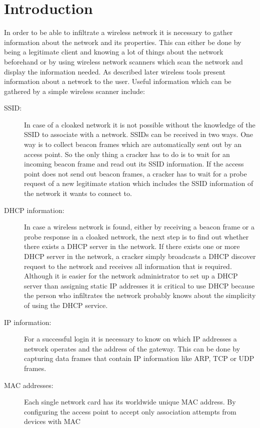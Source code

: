 \section{Introduction}

In order to be able to infiltrate a wireless network it is necessary to gather information about the network and its properties. This can either be done by being a legitimate client and knowing a lot of things about the network beforehand or by using wireless network scanners which scan the network and display the information needed. As described later wireless tools present information about a network to the user. Useful information which can be gathered by a simple wireless scanner include:

\begin{description}
    \item[SSID:]
		In case of a cloaked network it is not possible without the
		knowledge of the SSID to associate with a network. SSIDs can be received
		in two ways. One way is to collect beacon frames which are automatically sent out by an access point. So the only thing a cracker has to do is to wait for an incoming beacon frame and read out its SSID information. If the access point does not send out beacon frames, a cracker has to
		wait for a probe request of a new legitimate station which includes the SSID information of the network it wants to connect to.
	\item[DHCP information:]
		In case a wireless network is found, either by receiving a beacon frame
		or a probe response in a cloaked network, the next step is to find
		out whether there exists a DHCP server in the network. If there exists
		one or more DHCP server in the network, a cracker simply broadcasts a
		DHCP discover request to the network and receives all information that is
		required. Although it is easier for the network administrator to
		set up a DHCP server than assigning static IP addresses it is critical
		to use DHCP because the person who infiltrates the network
		probably knows about the simplicity of using the DHCP service.
	\item[IP information:]
		For a successful login it is necessary to know on which IP addresses a 
		network operates and the address of the gateway. This can be done by 
		capturing data frames that contain IP information like ARP, TCP or UDP 
		frames.
	\item[MAC addresses:]
		Each single network card has its worldwide unique MAC address. By 
		configuring the access point to accept only association attempts from devices with MAC 

\end{description}

